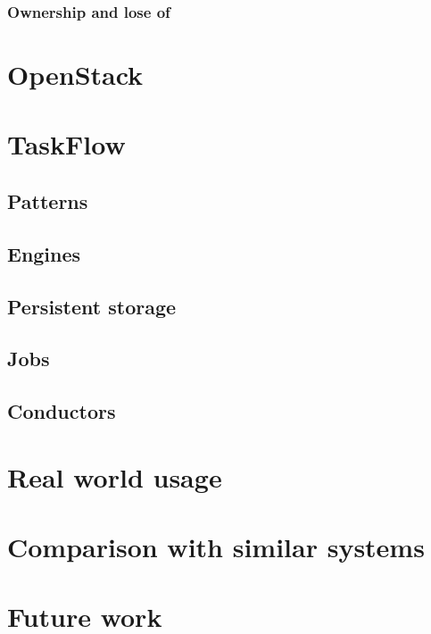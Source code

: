 \documentclass[11pt,a4paper]{article}
\begin{document}
\subsubsection{Ownership and lose of}

\section{OpenStack}

\section{TaskFlow}

\subsection{Patterns}

\subsection{Engines}

\subsection{Persistent storage}

\subsection{Jobs}

\subsection{Conductors}

\section{Real world usage}

\section{Comparison with similar systems}

\section{Future work}
\end{document}

